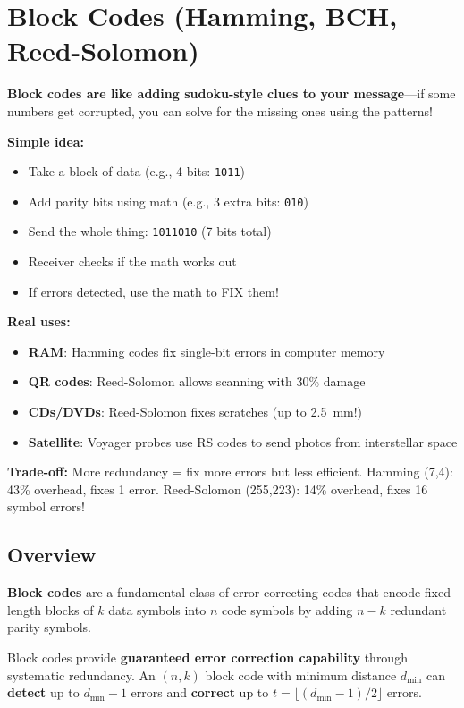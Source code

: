 \chapter{Block Codes (Hamming, BCH, Reed-Solomon)}
\label{ch:block-codes}

\begin{nontechnical}
\textbf{Block codes are like adding sudoku-style clues to your message}---if some numbers get corrupted, you can solve for the missing ones using the patterns!

\textbf{Simple idea:}
\begin{itemize}
\item Take a block of data (e.g., 4 bits: \texttt{1011})
\item Add parity bits using math (e.g., 3 extra bits: \texttt{010})
\item Send the whole thing: \texttt{1011010} (7 bits total)
\item Receiver checks if the math works out
\item If errors detected, use the math to FIX them!
\end{itemize}

\textbf{Real uses:} 
\begin{itemize}
\item \textbf{RAM}: Hamming codes fix single-bit errors in computer memory
\item \textbf{QR codes}: Reed-Solomon allows scanning with 30\% damage
\item \textbf{CDs/DVDs}: Reed-Solomon fixes scratches (up to 2.5~mm!)
\item \textbf{Satellite}: Voyager probes use RS codes to send photos from interstellar space
\end{itemize}

\textbf{Trade-off:} More redundancy = fix more errors but less efficient. Hamming (7,4): 43\% overhead, fixes 1 error. Reed-Solomon (255,223): 14\% overhead, fixes 16 symbol errors!
\end{nontechnical}

\section{Overview}

\textbf{Block codes} are a fundamental class of error-correcting codes that encode fixed-length blocks of $k$ data symbols into $n$ code symbols by adding $n-k$ redundant parity symbols.

\begin{keyconcept}
Block codes provide \textbf{guaranteed error correction capability} through systematic redundancy. An $(n,k)$ block code with minimum distance $d_{\min}$ can \textbf{detect} up to $d_{\min}-1$ errors and \textbf{correct} up to $t = \lfloor (d_{\min}-1)/2 \rfloor$ errors.
\end{keyconcept}

